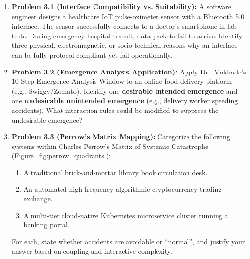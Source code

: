 \begin{enumerate}[leftmargin=2em]
    \item \textbf{Problem 3.1 (Interface Compatibility vs. Suitability):}
    A software engineer designs a healthcare IoT pulse-oximeter sensor with a Bluetooth 5.0 interface. The sensor successfully connects to a doctor's smartphone in lab tests. During emergency hospital transit, data packets fail to arrive. Identify three physical, electromagnetic, or socio-technical reasons why an interface can be fully protocol-compliant yet fail operationally.

    \item \textbf{Problem 3.2 (Emergence Analysis Application):}
    Apply Dr.~Mokhade's 10-Step Emergence Analysis Window to an online food delivery platform (e.g., Swiggy/Zomato). Identify one \textbf{desirable intended emergence} and one \textbf{undesirable unintended emergence} (e.g., delivery worker speeding accidents). What interaction rules could be modified to suppress the undesirable emergence?

    \item \textbf{Problem 3.3 (Perrow's Matrix Mapping):}
    Categorize the following systems within Charles Perrow's Matrix of Systemic Catastrophe (Figure~\ref{fig:perrow_quadrants}):
    \begin{enumerate}[label=(\alph*)]
        \item A traditional brick-and-mortar library book circulation desk.
        \item An automated high-frequency algorithmic cryptocurrency trading exchange.
        \item A multi-tier cloud-native Kubernetes microservice cluster running a banking portal.
    \end{enumerate}
    For each, state whether accidents are avoidable or ``normal'', and justify your answer based on coupling and interactive complexity.
\end{enumerate}
